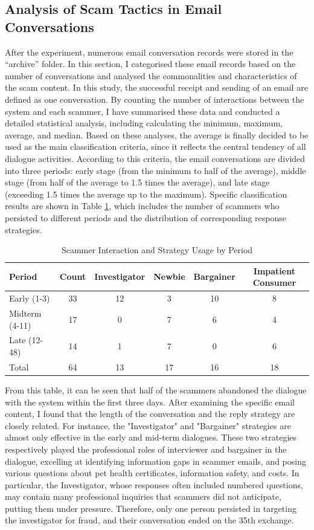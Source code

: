\documentclass[ oneside,%
                    author={Cassie Qing Tang},
                    degree={BSc},
                     title={An Automated Response System for Disrupting Online Pet Scamming \\ },
                    subtitle={ }]{dissertation}
\begin{document}
\subsection{Analysis of Scam Tactics in Email Conversations}
After the experiment, numerous email conversation records were stored in the “archive” folder. In this section, I categorised these email records based on the number of conversations and analysed the commonalities and characteristics of the scam content. In this study, the successful receipt and sending of an email are defined as one conversation. By counting the number of interactions between the system and each scammer, I have summarised these data and conducted a detailed statistical analysis, including calculating the minimum, maximum, average, and median. Based on these analyses, the average is finally decided to be used as the main classification criteria, since it reflects the central tendency of all dialogue activities. According to this criteria, the email conversations are divided into three periods: early stage (from the minimum to half of the average), middle stage (from half of the average to 1.5 times the average), and late stage (exceeding 1.5 times the average up to the maximum). Specific classification results are shown in Table \ref{tab:table4}, which includes the number of scammers who persisted to different periods and the distribution of corresponding response strategies.
\begin{table}[H]
\centering
\begin{tabular}{@{}lccccc@{}} 
\toprule
Period & Count & Investigator & Newbie & Bargainer & Impatient Consumer \\ 
\midrule
Early (1-3) & 33 & 12 & 3 & 10 & 8 \\
Midterm (4-11) & 17 & 0 & 7 & 6 & 4 \\
Late (12-48) & 14 & 1 & 7 & 0 & 6 \\
Total  & 64 & 13 & 17 & 16 & 18 \\
\bottomrule
\end{tabular}
\caption{Scammer Interaction and Strategy Usage by Period}
\label{tab:table4}
\end{table}

From this table, it can be seen that half of the scammers abandoned the dialogue with the system within the first three days. After examining the specific email content, I found that the length of the conversation and the reply strategy are closely related. For instance, the "Investigator" and "Bargainer" strategies are almost only effective in the early and mid-term dialogues. These two strategies respectively played the professional roles of interviewer and bargainer in the dialogue, excelling at identifying information gaps in scammer emails, and posing various questions about pet health certificates, information safety, and costs. In particular, the Investigator, whose responses often included numbered questions, may contain many professional inquiries that scammers did not anticipate, putting them under pressure. Therefore, only one person persisted in targeting the investigator for fraud, and their conversation ended on the 35th exchange.
\\
\end{document}
